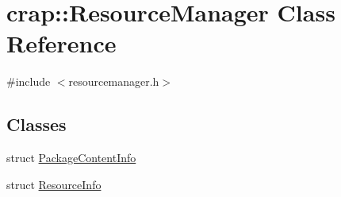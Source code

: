 \hypertarget{classcrap_1_1_resource_manager}{}\section{crap\+:\+:Resource\+Manager Class Reference}
\label{classcrap_1_1_resource_manager}


{\ttfamily \#include $<$resourcemanager.\+h$>$}

\subsection*{Classes}
\begin{DoxyCompactItemize}
\item 
struct \hyperlink{structcrap_1_1_resource_manager_1_1_package_content_info}{Package\+Content\+Info}
\item 
struct \hyperlink{structcrap_1_1_resource_manager_1_1_resource_info}{Resource\+Info}
\end{DoxyCompactItemize}

